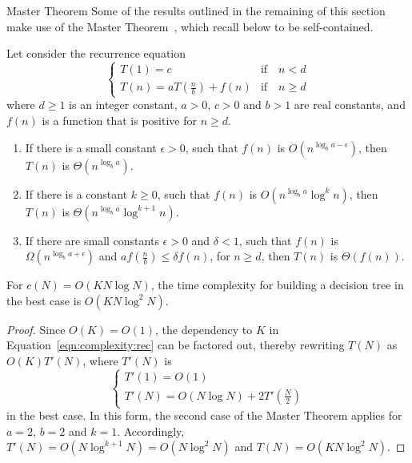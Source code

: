 \begin{remark}{Master Theorem}
Some of the results outlined in the remaining of this section make use of the
Master Theorem~\citep{goodrich:2006}, which recall below to be self-contained.

\begin{theorem}
Let consider the recurrence equation
\begin{equation}
\begin{cases}
T(1) = c & \text{if}\quad n < d\\
T(n) = aT(\frac{n}{b}) + f(n) & \text{if}\quad n \geq d
\end{cases}
\end{equation}
where $d \geq 1$ is an integer constant, $a > 0$, $c>0$ and $b>1$ are real constants, and
$f(n)$ is a function that is positive for $n \geq d$.

\begin{enumerate}
\item If there is a small constant $\epsilon > 0$, such that $f(n)$ is $O(n^{\log_b a - \epsilon})$, then $T(n)$ is $\Theta(n^{\log_b a})$.
\item If there is a constant $k \geq 0$, such that $f(n)$ is $O(n^{\log_b a} \log^k n)$, then $T(n)$ is $\Theta(n^{\log_b a} \log^{k+1} n)$.
\item If there are small constants $\epsilon > 0$ and $\delta < 1$, such that $f(n)$ is $\Omega(n^{\log_b a + \epsilon})$ and $af(\tfrac{n}{b}) \leq \delta f(n)$, for $n \geq d$, then $T(n)$ is $\Theta(f(n))$.
\end{enumerate}
\end{theorem}
\end{remark}

\begin{theorem}\label{thm:6:best:knlogn}
For $c(N)=O(K N\log N)$, the time complexity for building a decision
tree in the best case is $O(K N \log^2 N)$.
\end{theorem}

\begin{proof}
Since $O(K)=O(1)$, the dependency to $K$ in Equation~\ref{eqn:complexity:rec} can be factored out,
thereby rewriting $T(N)$ as $O(K) T'(N)$, where $T'(N)$ is
\begin{equation}
\begin{cases}
T'(1) = O(1) \\
T'(N) = O(N\log N) + 2 T'(\frac{N}{2})
\end{cases}
\end{equation}
in the best case. In this form, the second case of the Master Theorem applies for
$a=2$, $b=2$ and $k=1$. Accordingly, $T'(N)=O(N\log^{k+1} N)=O(N\log^2 N)$ and $T(N) = O(K N\log^2 N)$.
\end{proof}

